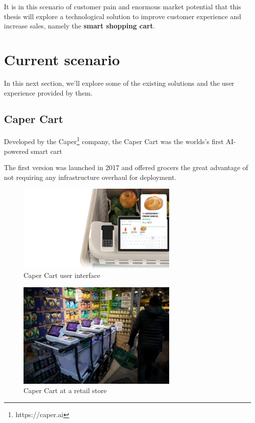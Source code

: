 \documentclass[openright]{normas-utf-tex} %
\begin{document}
It is in this scenario of customer pain and enormous market potential that this
thesis will explore a technological solution to improve customer experience and increase sales,
namely the \textbf{smart shopping cart}.

\section{Current scenario}

In this next section, we'll explore some of the existing solutions and the user experience
provided by them.

\subsection{Caper Cart}

Developed by the Caper\footnote{https://caper.ai} company, the Caper Cart was the worlds's first AI-powered smart cart \cite{Caper2020}

The first version was launched in 2017 and offered grocers the
great advantage of not requiring any infrastructure overhaul for deployment.

\begin{figure}[H]
	\centering
	\includegraphics[width=0.7\textwidth]{./images/capercartui.png}
	\caption[Caper Cart user interface]{Caper Cart user interface}
	\label{fig:caperui}
\end{figure}

\begin{figure}[H]
	\centering
	\includegraphics[width=0.7\textwidth]{./images/caper.png}
	\caption[Caper Cart at a retail store]{Caper Cart at a retail store}
	\label{fig:caperatretail}
\end{figure}
\end{document}
